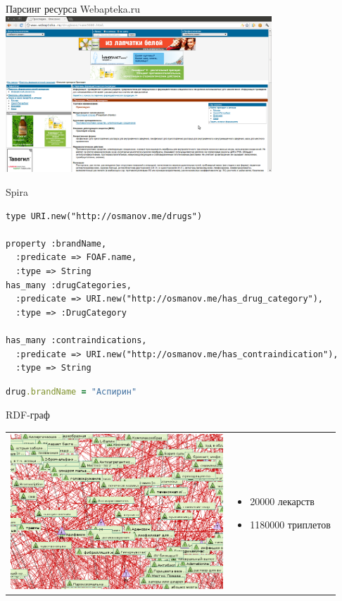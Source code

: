 \documentclass{beamer}
\begin{document}
\begin{frame}[t]{Парсинг ресурса Webapteka.ru}
\includegraphics[width=100mm]{webapteka.png}
\end{frame}
\begin{frame}[fragile]{Spira}
\begin{lstlisting}
type URI.new("http://osmanov.me/drugs")

property :brandName,  
  :predicate => FOAF.name, 
  :type => String
has_many :drugCategories, 
  :predicate => URI.new("http://osmanov.me/has_drug_category"), 
  :type => :DrugCategory

has_many :contraindications, 
  :predicate => URI.new("http://osmanov.me/has_contraindication"), 
  :type => String
\end{lstlisting}
\begin{lstlisting}[language=Ruby]
drug.brandName = "Аспирин"
\end{lstlisting}
\end{frame}
\begin{frame}[t]{RDF-граф}

\begin{tabular}{l l}
\begin{minipage}{0.75\textwidth}
\includegraphics[width=80mm]{graph.png}
\end{minipage}
&
\begin{minipage}{0.25\textwidth}
\begin{itemize}
\item 20000 лекарств
\item 1180000 триплетов
\end{itemize}
\end{minipage}
\end{tabular}
\end{frame}
\end{document}
